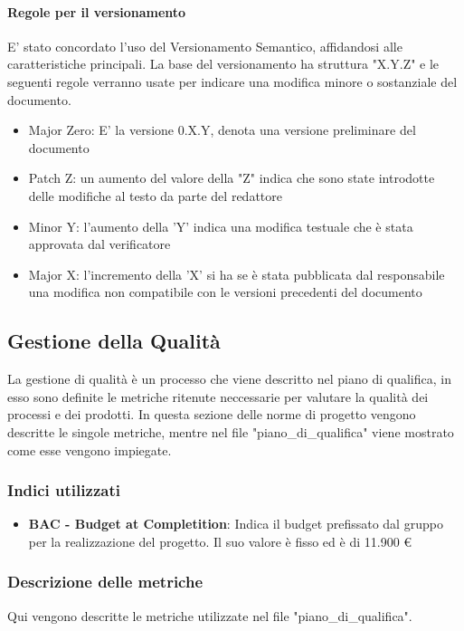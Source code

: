 \documentclass[12pt]{article}
\begin{document}
\paragraph{Regole per il versionamento}
\label{ver}
E' stato concordato l'uso del Versionamento Semantico, affidandosi alle caratteristiche principali.
La base del versionamento ha struttura "X.Y.Z" e le seguenti regole verranno usate per indicare una modifica minore o sostanziale del documento.
\begin{itemize}
    \item Major Zero: E' la versione 0.X.Y, denota una versione preliminare del documento
    \item Patch Z: un aumento del valore della "Z" indica che sono state introdotte delle modifiche al testo da parte del redattore
    \item Minor Y: l'aumento della 'Y' indica una modifica testuale che è stata approvata dal verificatore
    \item Major X: l'incremento della 'X' si ha se è stata pubblicata dal responsabile una modifica non compatibile con le versioni precedenti del documento
\end{itemize}

\subsection{Gestione della Qualità}
La gestione di qualità è un processo che viene descritto nel piano di qualifica, in esso sono definite le metriche ritenute neccessarie per valutare la qualità dei processi e dei prodotti.
In questa sezione delle norme di progetto vengono descritte le singole metriche, mentre nel file "piano\_di\_qualifica" viene mostrato come esse vengono impiegate.

\subsubsection{Indici utilizzati}
\begin{itemize}
    \item \textbf{BAC - Budget at Completition}: Indica il budget prefissato dal gruppo per la realizzazione del progetto. Il suo valore è fisso ed è di 11.900 \euro 
\end{itemize}

\subsubsection{Descrizione delle metriche}
Qui vengono descritte le metriche utilizzate nel file "piano\_di\_qualifica".
\end{document}
